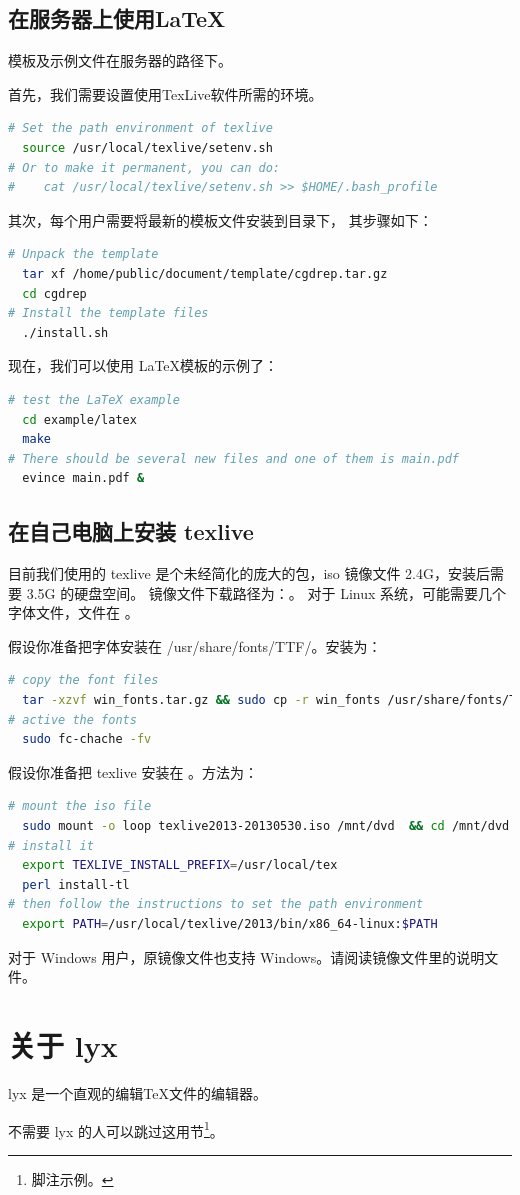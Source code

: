 \subsection{在服务器上使用\LaTeX}

模板及示例文件在服务器的路径下。

首先，我们需要设置使用TexLive软件所需的环境。
\begin{lstlisting}[language=sh,caption={直接使用 Helium 上的 \LaTeX}]
# Set the path environment of texlive 
  source /usr/local/texlive/setenv.sh
# Or to make it permanent, you can do:
#    cat /usr/local/texlive/setenv.sh >> $HOME/.bash_profile
\end{lstlisting}

其次，每个用户需要将最新的模板文件安装到目录下，
其步骤如下：
\begin{lstlisting}[language=sh,caption={安装\LaTeX{}模板}]
# Unpack the template
  tar xf /home/public/document/template/cgdrep.tar.gz
  cd cgdrep
# Install the template files
  ./install.sh
\end{lstlisting}

现在，我们可以使用 \LaTeX 模板的示例了：
\begin{lstlisting}[language=sh,caption={直接使用 Helium 上的 \LaTeX}]
# test the LaTeX example
  cd example/latex
  make
# There should be several new files and one of them is main.pdf
  evince main.pdf &
\end{lstlisting}

\subsection{在自己电脑上安装 texlive}
目前我们使用的 texlive 是个未经简化的庞大的包，iso 镜像文件 2.4G，安装后需要 3.5G 的硬盘空间。
镜像文件下载路径为：。
对于 Linux 系统，可能需要几个字体文件，文件在 。

假设你准备把字体安装在 /usr/share/fonts/TTF/。安装为：
\begin{lstlisting}[language=sh,caption={安装字体}]
# copy the font files
  tar -xzvf win_fonts.tar.gz && sudo cp -r win_fonts /usr/share/fonts/TTF/
# active the fonts
  sudo fc-chache -fv
\end{lstlisting}

假设你准备把 texlive 安装在  。方法为：
\begin{lstlisting}[language=sh,caption={安装 Texlive}]
# mount the iso file
  sudo mount -o loop texlive2013-20130530.iso /mnt/dvd  && cd /mnt/dvd
# install it
  export TEXLIVE_INSTALL_PREFIX=/usr/local/tex
  perl install-tl
# then follow the instructions to set the path environment
  export PATH=/usr/local/texlive/2013/bin/x86_64-linux:$PATH
\end{lstlisting}

对于 Windows 用户，原镜像文件也支持 Windows。请阅读镜像文件里的说明文件。

\section{关于 lyx}
lyx 是一个直观的编辑\TeX 文件的编辑器。

不需要 lyx 的人可以跳过这用节\footnote{脚注示例。}。


